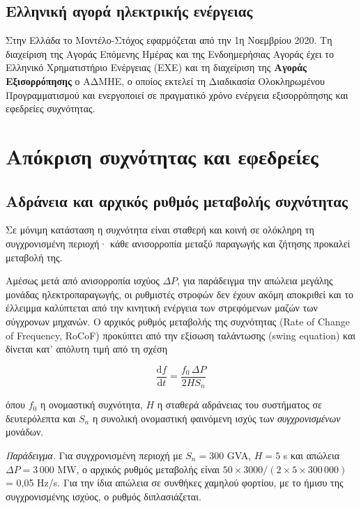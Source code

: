 \subsection{Ελληνική αγορά ηλεκτρικής ενέργειας}

Στην Ελλάδα το Μοντέλο-Στόχος εφαρμόζεται από την 1η Νοεμβρίου 2020. Τη διαχείριση της
Αγοράς Επόμενης Ημέρας και της Ενδοημερήσιας Αγοράς έχει το Ελληνικό Χρηματιστήριο Ενέργειας
(ΕΧΕ) και τη διαχείριση της \textbf{Αγοράς Εξισορρόπησης} ο ΑΔΜΗΕ, ο οποίος εκτελεί τη
Διαδικασία Ολοκληρωμένου Προγραμματισμού και ενεργοποιεί σε πραγματικό χρόνο ενέργεια
εξισορρόπησης και εφεδρείες συχνότητας.

\section{Απόκριση συχνότητας και εφεδρείες}

\subsection{Αδράνεια και αρχικός ρυθμός μεταβολής συχνότητας}

Σε μόνιμη κατάσταση η συχνότητα είναι σταθερή και κοινή σε ολόκληρη τη συγχρονισμένη
περιοχή· κάθε ανισορροπία μεταξύ παραγωγής και ζήτησης προκαλεί μεταβολή της.

Αμέσως μετά από ανισορροπία ισχύος $\Delta P$, για παράδειγμα την απώλεια μεγάλης μονάδας
ηλεκτροπαραγωγής, οι ρυθμιστές στροφών δεν έχουν ακόμη αποκριθεί και το έλλειμμα καλύπτεται
από την κινητική ενέργεια των στρεφόμενων μαζών των σύγχρονων μηχανών. Ο αρχικός ρυθμός
μεταβολής της συχνότητας (Rate of Change of Frequency, RoCoF) προκύπτει από την εξίσωση
ταλάντωσης (swing equation) και δίνεται κατ' απόλυτη τιμή από τη σχέση

\begin{equation}
\frac{\mathrm{d}f}{\mathrm{d}t} = \frac{f_0 \, \Delta P}{2 H S_n}
\label{eq:rocof}
\end{equation}

όπου $f_0$ η ονομαστική συχνότητα, $H$ η σταθερά αδράνειας του συστήματος σε δευτερόλεπτα
και $S_n$ η συνολική ονομαστική φαινόμενη ισχύς των \emph{συγχρονισμένων} μονάδων.

\emph{Παράδειγμα.} Για συγχρονισμένη περιοχή με $S_n = 300$ GVA, $H = 5$ s και απώλεια
$\Delta P = 3\,000$ MW, ο αρχικός ρυθμός μεταβολής είναι
$50 \times 3000 / (2 \times 5 \times 300\,000)$ = 0,05 Hz/s. Για την ίδια απώλεια σε
συνθήκες χαμηλού φορτίου, με το ήμισυ της συγχρονισμένης ισχύος, ο ρυθμός διπλασιάζεται.


